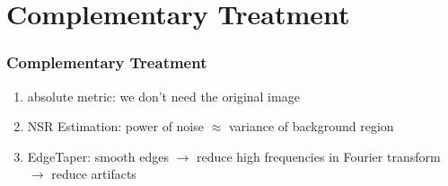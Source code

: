 \section[Compl. Treatment]{Complementary Treatment}
\begin{frame}
  \frametitle{Complementary Treatment}
  \begin{enumerate}
  \item absolute metric: we don't need the original image
  \item NSR Estimation: power of noise $\approx$ variance of background region
  \item EdgeTaper: smooth edges $\rightarrow$ reduce high frequencies in Fourier transform $\rightarrow$ reduce artifacts
  \end{enumerate}
\end{frame}

